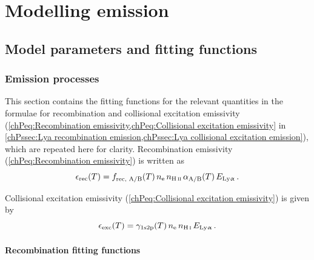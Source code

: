 \chapter{Modelling \texorpdfstring{\lymana}{\lymanatext} emission}
\label{app:Modelling Lya emission}



\section{Model parameters and fitting functions}
\label{appPsec:Model parameters}

\subsection{Emission processes}

This section contains the fitting functions for the relevant quantities in the formulae for recombination and collisional excitation emissivity (\cref{chPeq:Recombination emissivity,chPeq:Collisional excitation emissivity} in \cref{chPssec:Lya recombination emission,chPssec:Lya collisional excitation emission}), which are repeated here for clarity. Recombination emissivity (\cref{chPeq:Recombination emissivity}) is written as
\begin{equation}
    \label{appPeq:AppRecombination emissivity}
    \epsilon_\text{rec}(T) = f_\text{rec, A/B} (T) \, n_\text{e} \, n_\text{\ion{H}{II}} \, \alpha_\text{A/B}(T) \, E_\text{\lya} \, .
\end{equation}

Collisional excitation emissivity (\cref{chPeq:Collisional excitation emissivity}) is given by
\begin{equation}
    \label{appPeq:AppCollisional excitation emissivity}
    \epsilon_\text{exc}(T) = \gamma_\text{1s2p} (T) \, n_\text{e} \, n_\text{\ion{H}{I}} \, E_\text{\lya} \, .
\end{equation}

\subsubsection{Recombination fitting functions}

